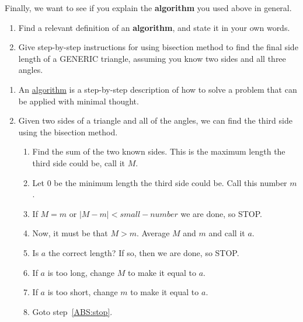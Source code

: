 \documentclass[handout,nooutcomes,noauthor]{ximera}
\begin{document}
\begin{question}
  Finally, we want to see if you explain the \textbf{algorithm} you
  used above in general.
  \begin{enumerate}
    \item Find a relevant definition of an \textbf{algorithm}, and state it in
      your own words.
    \item  Give step-by-step instructions for using bisection method to find
  the final side length of a GENERIC triangle, assuming you know two sides and
  all three angles.
  \end{enumerate}
  \begin{freeResponse}
    \begin{enumerate}
    \item An \underline{algorithm} is a step-by-step description of how
      to solve a problem that can be applied with minimal thought.
    \item Given two sides of a triangle and all of the angles, we can
      find the third side using the bisection method.

    \begin{enumerate}
      \item Find the sum of the two known sides. This is the maximum
        length the third side could be, call it $M$.
      \item Let $0$ be the minimum length the third side could be. Call this number $m$.
      \item\label{ABS:stop} If $M=m$ or $|M-m|< small-number$ we are done, so STOP.
      \item Now, it must be that $M>m$. Average $M$ and $m$ and call it $a$.
      \item Is $a$ the correct length? If so, then we are done, so STOP.
      \item If $a$ is too long, change $M$ to make it equal to $a$.
      \item If $a$ is too short, change $m$ to make it equal to $a$.
      \item Goto step~\ref{ABS:stop}.
    \end{enumerate}
    \end{enumerate}
  \end{freeResponse}
\end{question}
\end{document}
